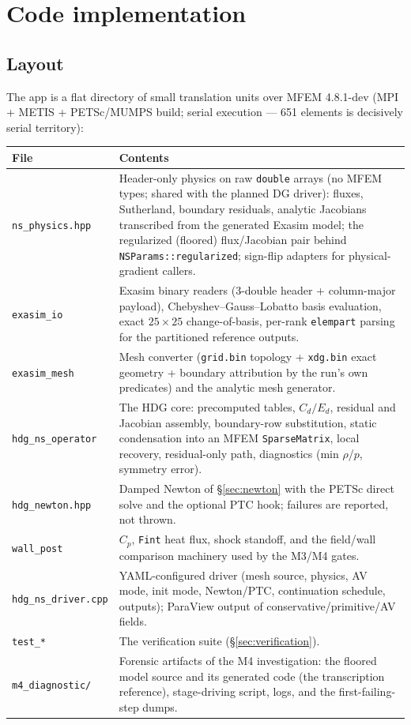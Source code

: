\documentclass[11pt]{article}
\newcommand{\code}[1]{\texttt{#1}}
\begin{document}
\section{Code implementation}
\label{sec:code}

\subsection{Layout}

The app is a flat directory of small translation units over MFEM 4.8.1-dev
(MPI + METIS + PETSc/MUMPS build; serial execution --- 651 elements is
decisively serial territory):
\begin{center}
\begin{tabular}{lp{}}
\toprule
File & Contents\\
\midrule
\code{ns\_physics.hpp} & Header-only physics on raw \code{double} arrays (no
MFEM types; shared with the planned DG driver): fluxes, Sutherland, boundary
residuals, analytic Jacobians transcribed from the generated Exasim model;
the regularized (floored) flux/Jacobian pair behind
\code{NSParams::regularized}; sign-flip adapters for physical-gradient
callers.\\
\code{exasim\_io} & Exasim binary readers (3-double header + column-major
payload), Chebyshev--Gauss--Lobatto basis evaluation, exact $25\times25$
change-of-basis, per-rank \code{elempart} parsing for the partitioned
reference outputs.\\
\code{exasim\_mesh} & Mesh converter (\code{grid.bin} topology +
\code{xdg.bin} exact geometry + boundary attribution by the run's own
predicates) and the analytic mesh generator.\\
\code{hdg\_ns\_operator} & The HDG core: precomputed tables, $C_d/E_d$,
residual and Jacobian assembly, boundary-row substitution, static
condensation into an MFEM \code{SparseMatrix}, local recovery,
residual-only path, diagnostics (min $\rho$/$p$, symmetry error).\\
\code{hdg\_newton.hpp} & Damped Newton of \S\ref{sec:newton} with the PETSc
direct solve and the optional PTC hook; failures are reported, not thrown.\\
\code{wall\_post} & $C_p$, \code{Fint} heat flux, shock standoff, and the
field/wall comparison machinery used by the M3/M4 gates.\\
\code{hdg\_ns\_driver.cpp} & YAML-configured driver (mesh source, physics,
AV mode, init mode, Newton/PTC, continuation schedule, outputs); ParaView
output of conservative/primitive/AV fields.\\
\code{test\_*} & The verification suite (\S\ref{sec:verification}).\\
\code{m4\_diagnostic/} & Forensic artifacts of the M4 investigation: the
floored model source and its generated code (the transcription reference),
stage-driving script, logs, and the first-failing-step dumps.\\
\bottomrule
\end{tabular}
\end{center}
\end{document}
